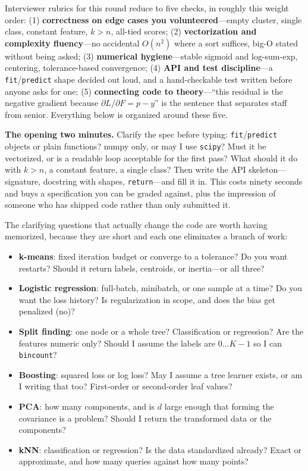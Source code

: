 \begin{keyinsight}
Interviewer rubrics for this round reduce to five checks, in roughly this weight order: (1) \textbf{correctness on edge cases you volunteered}---empty cluster, single class, constant feature, $k > n$, all-tied scores; (2) \textbf{vectorization and complexity fluency}---no accidental $O(n^2)$ where a sort suffices, big-O stated without being asked; (3) \textbf{numerical hygiene}---stable sigmoid and log-sum-exp, centering, tolerance-based convergence; (4) \textbf{API and test discipline}---a \texttt{fit}/\texttt{predict} shape decided out loud, and a hand-checkable test written before anyone asks for one; (5) \textbf{connecting code to theory}---``this residual is the negative gradient because $\partial L/\partial F = p - y$'' is the sentence that separates staff from senior. Everything below is organized around these five.
\end{keyinsight}

\textbf{The opening two minutes.} Clarify the spec before typing: \texttt{fit}/\texttt{predict} objects or plain functions? numpy only, or may I use \texttt{scipy}? Must it be vectorized, or is a readable loop acceptable for the first pass? What should it do with $k > n$, a constant feature, a single class? Then write the API skeleton---signature, docstring with shapes, \texttt{return}---and fill it in. This costs ninety seconds and buys a specification you can be graded against, plus the impression of someone who has shipped code rather than only submitted it.

The clarifying questions that actually change the code are worth having memorized, because they are short and each one eliminates a branch of work:

\begin{itemize}
    \item \textbf{k-means}: fixed iteration budget or converge to a tolerance? Do you want restarts? Should it return labels, centroids, or inertia---or all three?
    \item \textbf{Logistic regression}: full-batch, minibatch, or one sample at a time? Do you want the loss history? Is regularization in scope, and does the bias get penalized (no)?
    \item \textbf{Split finding}: one node or a whole tree? Classification or regression? Are the features numeric only? Should I assume the labels are $0 \ldots K{-}1$ so I can \texttt{bincount}?
    \item \textbf{Boosting}: squared loss or log loss? May I assume a tree learner exists, or am I writing that too? First-order or second-order leaf values?
    \item \textbf{PCA}: how many components, and is $d$ large enough that forming the covariance is a problem? Should I return the transformed data or the components?
    \item \textbf{kNN}: classification or regression? Is the data standardized already? Exact or approximate, and how many queries against how many points?
\end{itemize}

